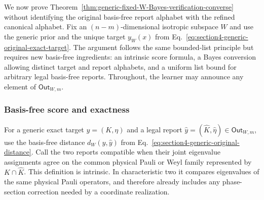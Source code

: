 \documentclass[11pt]{article}
\newcommand{\1}{\mathbf 1}
\theoremstyle{plain}
\theoremstyle{definition}
\theoremstyle{remark}
\begin{document}
We now prove
Theorem~\ref{thm:generic-fixed-W-Bayes-verification-converse} without
identifying the original basis-free report alphabet with the refined
canonical alphabet.  Fix an $(n-m)$-dimensional isotropic subspace $W$ and
use the generic prior and the unique target $y_W(x)$ from
Eq.~\eqref{eq:section4-generic-original-exact-target}.  The argument follows the same bounded-list principle but requires new  
basis-free ingredients: an intrinsic score formula, a Bayes conversion allowing  
distinct target and report alphabets, and a uniform list bound for arbitrary  
legal basis-free reports.  Throughout, the learner may announce any element of  
$\mathsf{Out}_{W,m}$.  

\subsubsection{Basis-free score and exactness}
\label{subsubsec:generic-original-basis-free-score}

For a generic exact target $y=(K,\eta)$ and a legal report
$\widehat y=(\widehat K,\widehat\eta)\in\mathsf{Out}_{W,m}$, use the
basis-free distance $d_W(y,\widehat y)$ from
Eq.~\eqref{eq:section4-generic-original-distance}.
Call the two reports compatible when their joint eigenvalue assignments agree
on the common physical Pauli or Weyl family represented by
$K\cap\widehat K$.  This definition is intrinsic.  In characteristic two it
compares eigenvalues of the same physical Pauli operators, and therefore
already includes any phase-section correction needed by a coordinate
realization.
\end{document}
